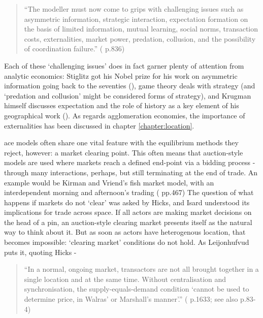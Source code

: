 \begin{quote}
``The modeller must now come to grips with challenging issues such as asymmetric information, strategic interaction, expectation formation on the basis of limited information, mutual learning, social norms, transaction costs, externalities, market power, predation, collusion, and the possibility of coordination failure.'' (\citealt{tesfatsion_agent-based_2006} p.836)
\end{quote}

Each of these `challenging issues' does in fact garner plenty of attention from analytic economics: Stiglitz got his Nobel prize for his work on asymmetric information going back to the seventies (\citealt{rothschild_equilibrium_1976}), game theory deals with strategy (and `predation and collusion' might be considered forms of strategy), and Krugman himself discusses expectation and the role of history  as a key element of his geographical work (\citealt{krugman_history_1991}). As regards agglomeration economies, the importance of externalities has been discussed in chapter \ref{chapter:location}. 

\gls{ace} models often share one vital feature with the equilibrium methods they reject, however: a market clearing point. This often means that auction-style models are used where markets reach a defined end-point via a bidding process - through many interactions, perhaps, but still terminating at the end of trade. An example would be Kirman and Vriend's fish market model, with an interdependent morning and afternoon's trading (\citealt{kirman_evolving_2001} pp.467) The question of what happens if markets do not `clear' was asked by Hicks, and Isard understood its implications for trade across space. If all actors are making market decisions on the head of a pin, an auction-style clearing market presents itself as the natural way to think about it. But as soon as actors have heterogenous location, that becomes impossible: `clearing market' conditions do not hold. As Leijonhufvud puts it, quoting Hicks -

\begin{quote}
``In a normal, ongoing market, transactors are not all brought together in a single location and at the same time. Without centralisation and synchronisation, the supply-equals-demand condition `cannot be used to determine price, in Walras' or Marshall's manner'.'' (\citealt{leijonhufvud_agent-based_2006} p.1633; see also \citealt{ladley_effects_2007} p.83-4) 
\end{quote}

